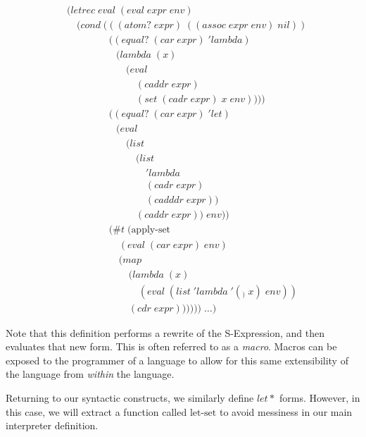 \begin{figure}[htp]
\caption{}\label{fig:syntaxSugarEval}
\begin{align*}
& (letrec \; eval \; (eval \; expr \; env)
\\& \quad (cond \; (((atom? \; expr) \; ((assoc \; expr \; env) \; nil))
\\& \qquad \qquad \; ((equal? \; (car \; expr) \; 'lambda) \; 
\\& \qquad \qquad \quad (lambda \; (x) \; 
\\& \qquad \qquad \qquad (eval \; 
\\& \qquad \qquad \qquad \quad (caddr \; expr) \; 
\\& \qquad \qquad \qquad \quad (set \; (cadr \; expr) \; x \; env))))
\\& \qquad \qquad \; ((equal? \; (car \; expr) \; 'let)
\\& \qquad \qquad \quad (eval \; 
\\& \qquad \qquad \qquad (list \; 
\\& \qquad \qquad \qquad \quad (list \; 
\\& \qquad \qquad \qquad \qquad 'lambda \; 
\\& \qquad \qquad \qquad \qquad (cadr \; expr) \; 
\\& \qquad \qquad \qquad \qquad (cadddr \; expr)) \; 
\\& \qquad \qquad \qquad \quad (caddr \; expr)) \; env))
\\& \qquad \qquad \; (\#t \; (\text{apply-set} \; 
\\& \qquad \qquad \quad \; (eval \; (car \; expr) \; env) \; 
\\& \qquad \qquad \quad \; (map \; 
\\& \qquad \qquad \qquad \; (lambda \; (x) \; 
\\& \qquad \qquad \qquad \quad \; (eval \; (list \; 'lambda \; '(_) \; x) \; env)) \; 
\\& \qquad \qquad \qquad \; (cdr \; expr)))))) \; \dots)
\end{align*}
\end{figure}

Note that this definition performs a rewrite of the S-Expression, and then
evaluates that new form. This is often referred to as a \emph{macro}. Macros can
be exposed to the programmer of a language to allow for this same 
extensibility of the language from \emph{within} the language.

Returning to our syntactic constructs, we similarly define $let*$ forms. 
However, in this case, we will extract a function called $\text{let-set}$ to avoid 
messiness in our main interpreter definition.

